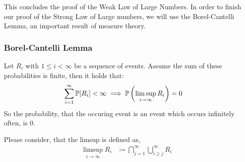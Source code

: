 This concludes the proof of the Weak Law of Large Numbers.
In order to finish our proof of the Strong Law of Large numbers,
we will use the Borel-Cantelli Lemma, an important result of measure theory.

\subsubsection{Borel-Cantelli Lemma}
\label{sec:bp-borel-cantelli}
%
\begin{lemma}\label{lemma:bcl}
  Let $R_i$ with $1 \leq i < \infty$ be a sequence of events.
  Assume the sum of these probabilities is finite, then it holds that:
  \begin{align}
    \sum_{i=1}^\infty \mathbb P[R_i] < \infty
    &\implies
    \mathbb P\left(\limsup\limits_{i\to\infty} R_i\right) = 0
  \end{align}
  So the probability, that the occuring event is an event which occurs infinitely often, is 0.
\end{lemma}

Please consider, that the limsup is defined as,
\begin{align}
  \limsup\limits_{i\to\infty} R_i &\coloneqq \bigcap_{j=1}^\infty \bigcup_{i \geq j}^\infty R_i \label{eq:limsup-char}
\end{align}
%
%

